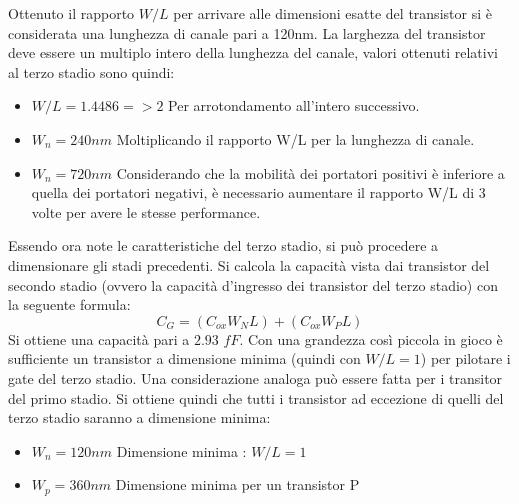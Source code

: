 \documentclass[12pt]{article} %
\begin{document}
Ottenuto il rapporto $W/L$ per arrivare alle dimensioni esatte del transistor si è considerata una lunghezza di canale pari a 120nm. La larghezza del transistor deve essere un multiplo intero della lunghezza del canale, valori ottenuti relativi al terzo stadio sono quindi:

\begin{itemize}
\item $W/L = 1.4486 => 2$  Per arrotondamento all'intero successivo.
\item $W_{n} = 240 nm$ Moltiplicando il rapporto W/L per la lunghezza di canale.
\item $W_{n} = 720 nm$ Considerando che la mobilità dei portatori positivi è inferiore a quella dei portatori negativi, è necessario aumentare il rapporto W/L di 3 volte per avere le stesse performance.
\end{itemize}

Essendo ora note le caratteristiche del terzo stadio, si può procedere a dimensionare gli stadi precedenti.
Si calcola la capacità vista dai transistor del secondo stadio (ovvero la capacità d'ingresso dei transistor del terzo stadio) con la seguente formula:
\begin{equation} 
C_{G}= (C_{ox}W_{N}L) + (C_{ox}W_{P}L)
\end{equation}
Si ottiene una capacità pari a $2.93$ $fF$. Con una grandezza così piccola in gioco è sufficiente un transistor a dimensione minima (quindi con $W/L =1$) per pilotare i gate del terzo stadio.
Una considerazione analoga può essere fatta per i transitor del primo stadio. Si ottiene quindi che tutti i transistor ad eccezione di quelli del terzo stadio saranno a dimensione minima:

\begin{itemize}
\item $W_{n} = 120 nm$ Dimensione minima :  $W/L = 1$
\item $W_{p} = 360 nm$ Dimensione minima per un transistor P
\end{itemize}
\end{document}
